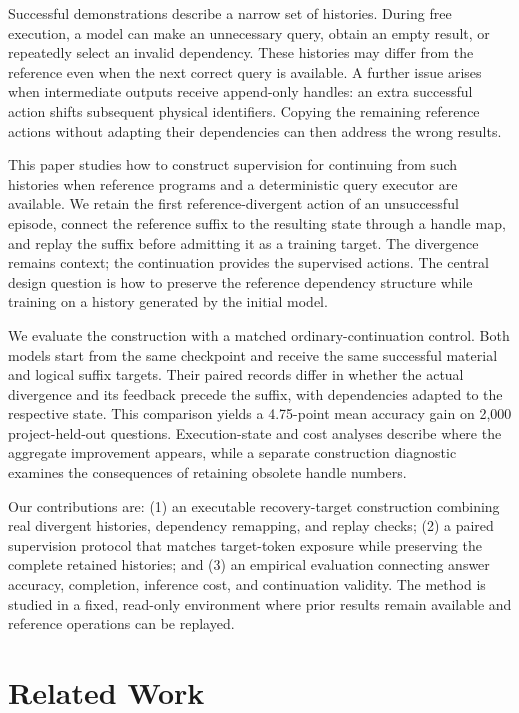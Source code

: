 Successful demonstrations describe a narrow set of histories. During free execution, a model can make an unnecessary query, obtain an empty result, or repeatedly select an invalid dependency. These histories may differ from the reference even when the next correct query is available. A further issue arises when intermediate outputs receive append-only handles: an extra successful action shifts subsequent physical identifiers. Copying the remaining reference actions without adapting their dependencies can then address the wrong results.

This paper studies how to construct supervision for continuing from such histories when reference programs and a deterministic query executor are available. We retain the first reference-divergent action of an unsuccessful episode, connect the reference suffix to the resulting state through a handle map, and replay the suffix before admitting it as a training target. The divergence remains context; the continuation provides the supervised actions. The central design question is how to preserve the reference dependency structure while training on a history generated by the initial model.

We evaluate the construction with a matched ordinary-continuation control. Both models start from the same checkpoint and receive the same successful material and logical suffix targets. Their paired records differ in whether the actual divergence and its feedback precede the suffix, with dependencies adapted to the respective state. This comparison yields a 4.75-point mean accuracy gain on 2,000 project-held-out questions. Execution-state and cost analyses describe where the aggregate improvement appears, while a separate construction diagnostic examines the consequences of retaining obsolete handle numbers.

Our contributions are: (1) an executable recovery-target construction combining real divergent histories, dependency remapping, and replay checks; (2) a paired supervision protocol that matches target-token exposure while preserving the complete retained histories; and (3) an empirical evaluation connecting answer accuracy, completion, inference cost, and continuation validity. The method is studied in a fixed, read-only environment where prior results remain available and reference operations can be replayed.

\section{Related Work}

